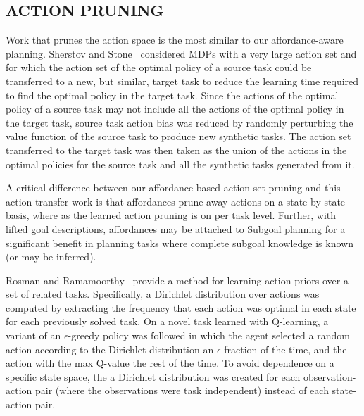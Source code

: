 \documentclass[]{article}
\newcommand{\jmnote}[1]{\textcolor{Green}{\textbf{JM: #1}}}
\begin{document}
\subsection{ACTION PRUNING}

Work that prunes the action space is the most similar to our affordance-aware planning.
Sherstov and Stone~\cite{sherstov2005improving} considered MDPs with a very large action set and for which the action
set of the optimal policy of a source task could be transferred to a new, but similar, target
task to reduce the learning time required to find the optimal policy in the target task. Since the actions
of the optimal policy of a source task may not include all the actions of the optimal policy
in the target task, source task action bias was reduced by randomly perturbing the value function
of the source task to produce new synthetic tasks. The action set transferred to the target task
was then taken as the union of the actions in the optimal policies for the source task and all the
synthetic tasks generated from it.

A critical difference between our affordance-based action set pruning and this action transfer
work is that affordances prune away actions on a state by state basis, where
as the learned action pruning is on per task level. %
Further,
with lifted goal descriptions, affordances may be attached to Subgoal planning for a significant
benefit in planning tasks where complete subgoal knowledge is known (or may be inferred).

Rosman and Ramamoorthy~\cite{rosman2012good} provide a method for learning action priors over a set of related tasks. Specifically, a Dirichlet distribution over actions was computed by extracting the frequency that each action was optimal in each state for each previously solved task. On a novel task learned with Q-learning, a variant of an $\epsilon$-greedy policy was followed in which the agent selected a random action according to the Dirichlet distribution an $\epsilon$ fraction of the time, and the action with the max Q-value the rest of the time. To avoid dependence on a specific state space, the a Dirichlet distribution was created for each observation-action pair (where the observations were task independent) instead of each state-action pair.
\end{document}
